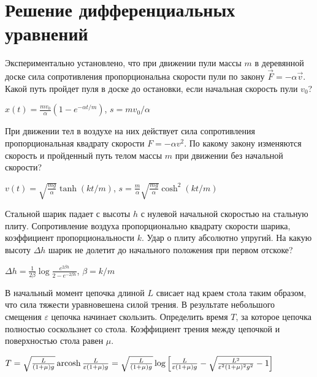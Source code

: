 \section{Решение дифференциальных уравнений}

\begin{ex}
Экспериментально установлено, что при движении пули массы $m$ в деревянной доске сила сопротивления пропорциональна скорости пули по закону $\vec{F} = - \alpha \vec{v}$. Какой путь пройдет пуля в доске до остановки, если начальная скорость пули $v_0$?
\begin{ans}
$x(t) = \frac{mv_0}{\alpha}\left( 1 - e^{-\alpha t /m}\right)$, $s = mv_0/\alpha$
\end{ans}
\end{ex}

\begin{ex}
При движении тел в воздухе на них действует сила сопротивления пропорциональная квадрату скорости $F = - \alpha v^2$. По какому закону изменяются скорость и пройденный путь телом массы $m$ при движении без начальной скорости?
\begin{ans}
$v(t) = \sqrt{\frac{mg}{\alpha}} \tanh (kt/m)$, $s = \frac{m}{\alpha} \sqrt{\frac{mg}{\alpha}} \cosh^2 (kt/m)$
\end{ans}
\end{ex}

\begin{ex}
Стальной шарик падает с высоты $h$ с нулевой начальной скоростью на стальную плиту. Сопротивление воздуха пропорционально квадрату скорости шарика, коэффициент пропорциональности $k$. Удар о плиту абсолютно упругий. На какую высоту $\Delta h$ шарик не долетит до начального положения при первом отскоке?
\begin{ans}
$\Delta h = \frac{1}{2\beta} \log \frac{e^{2\beta h}}{2 - e^{-2\beta h}}$, $\beta = k/m$
\end{ans}
\end{ex}

\begin{ex}
В начальный момент цепочка длиной $L$ свисает над краем стола таким образом, что сила тяжести уравновешена силой трения. В результате небольшого смещения $\varepsilon$ цепочка начинает скользить. Определить время $T$, за которое цепочка полностью соскользнет со стола. Коэффициент трения между цепочкой и поверхностью стола равен $\mu$.
\begin{ans}
$T = \sqrt{\frac{L}{(1+\mu) g}} \operatorname{arcosh} \frac{L}{\varepsilon (1+\mu)g} = \sqrt{\frac{L}{(1+\mu) g}} \log \left[ \frac{L}{\varepsilon (1+\mu) g} - \sqrt{\frac{L^2}{\varepsilon^2 (1+\mu)^2 g^2} - 1}\right]$
\end{ans}
\end{ex}

